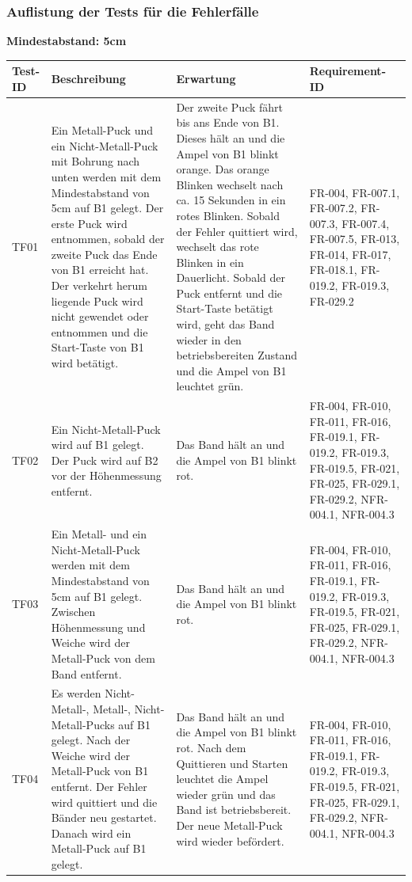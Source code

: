 \documentclass[oneside,a4paper,titlepage]{scrartcl} %
\begin{document}
\subsubsection{Auflistung der Tests für die Fehlerfälle}
\textbf{Mindestabstand: 5cm}
\begin{small}
  \begin{longtable}{|C{1.5cm}|L{4cm}|L{4.5cm}|C{3.0cm}|}
    \hline
    \textbf{Test-ID} & \textbf{Beschreibung} & \textbf{Erwartung} & \textbf{Requirement-ID}\\
    \toprule
    \endhead
    \hline
    TF01 & Ein Metall-Puck und ein Nicht-Metall-Puck mit Bohrung nach unten werden mit dem Mindestabstand von 5cm auf B1 gelegt. Der erste Puck wird entnommen, sobald der zweite Puck das Ende von B1 erreicht hat. Der verkehrt herum liegende Puck wird nicht gewendet oder entnommen und die Start-Taste von B1 wird betätigt. & Der zweite Puck fährt bis ans Ende von B1. Dieses hält an und die Ampel von B1 blinkt orange. Das orange Blinken wechselt nach ca. 15 Sekunden in ein rotes Blinken. Sobald der Fehler quittiert wird, wechselt das rote Blinken in ein Dauerlicht. Sobald der Puck entfernt und die Start-Taste betätigt wird, geht das Band wieder in den betriebsbereiten Zustand und die Ampel von B1 leuchtet grün. & FR-004, FR-007.1, FR-007.2, FR-007.3, FR-007.4, FR-007.5, FR-013, FR-014, FR-017, FR-018.1, FR-019.2, FR-019.3, FR-029.2\\
    \hline
     TF02 & Ein Nicht-Metall-Puck wird auf B1 gelegt. Der Puck wird auf B2 vor der Höhenmessung entfernt. & Das Band hält an und die Ampel von B1 blinkt rot. & FR-004, FR-010, FR-011, FR-016, FR-019.1, FR-019.2, FR-019.3, FR-019.5, FR-021, FR-025, FR-029.1, FR-029.2, NFR-004.1, NFR-004.3\\
    \hline
    TF03 & Ein Metall- und ein Nicht-Metall-Puck werden mit dem Mindestabstand von 5cm auf B1 gelegt. Zwischen Höhenmessung und Weiche wird der Metall-Puck von dem Band entfernt. & Das Band hält an und die Ampel von B1 blinkt rot. & FR-004, FR-010, FR-011, FR-016, FR-019.1, FR-019.2, FR-019.3, FR-019.5, FR-021, FR-025, FR-029.1, FR-029.2, NFR-004.1, NFR-004.3\\
    \hline
     TF04 & Es werden Nicht-Metall-, Metall-, Nicht-Metall-Pucks auf B1 gelegt. Nach der Weiche wird der Metall-Puck von B1 entfernt. Der Fehler wird quittiert und die Bänder neu gestartet. Danach wird ein Metall-Puck auf B1 gelegt. & Das Band hält an und die Ampel von B1 blinkt rot. Nach dem Quittieren und Starten leuchtet die Ampel wieder grün und das Band ist betriebsbereit. Der neue Metall-Puck wird wieder befördert. & FR-004, FR-010, FR-011, FR-016, FR-019.1, FR-019.2, FR-019.3, FR-019.5, FR-021, FR-025, FR-029.1, FR-029.2, NFR-004.1, NFR-004.3\\

\end{longtable}
\end{small}
\end{document}
